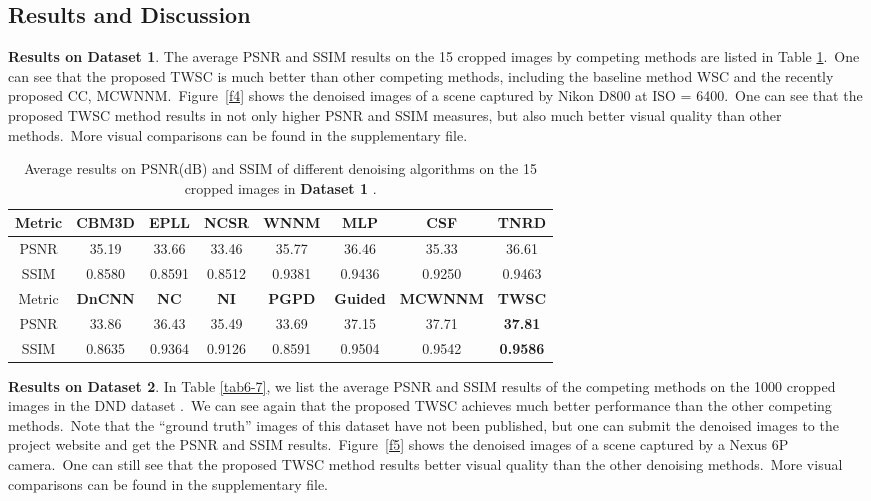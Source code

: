 \subsection{Results and Discussion}

\textbf{Results on Dataset 1}. The average PSNR and SSIM results on the 15 cropped images by competing methods are listed in Table \ref{tab6-6}.\ One can see that the proposed TWSC is much better than other competing methods, including the baseline method WSC and the recently proposed CC, MCWNNM.\ Figure\ \ref{f4} shows the denoised images of a scene captured by Nikon D800 at ISO = 6400.\ One can see that the proposed TWSC method results in not only higher PSNR and SSIM measures, but also much better visual quality than other methods.\ More visual comparisons can be found in the supplementary file.

\begin{table}[hbp]
\caption{Average results on PSNR(dB) and SSIM of different denoising algorithms on the 15 cropped images in \textbf{Dataset 1} \cite{crosschannel2016}.}
\scriptsize
\label{tab6-6}
\begin{center}
\renewcommand\arraystretch{1.2}
\begin{tabular*}{1\textwidth}{@{\extracolsep{\fill}}cccccccc}
\hline
Metric
&
\textbf{CBM3D}
&
\textbf{EPLL}
&
\textbf{NCSR}
&
\textbf{WNNM}
&
\textbf{MLP}
&
\textbf{CSF}
&
\textbf{TNRD}
\\
\hline
PSNR & 35.19  & 33.66 & 33.46 &  35.77 &  36.46 & 35.33 & 36.61  
\\
\hline
SSIM & 0.8580 & 0.8591  & 0.8512 & 0.9381 &  0.9436  & 0.9250 & 0.9463 
\\
\hline
Metric
&
\textbf{DnCNN}
&
\textbf{NC}
&
\textbf{NI}
&
\textbf{PGPD}
&
\textbf{Guided}
&
\textbf{MCWNNM}
&
\textbf{TWSC}
\\
\hline
PSNR &  33.86  & 36.43  & 35.49  & 33.69  &  37.15 &  37.71 &  \textbf{37.81}
\\
\hline
SSIM & 0.8635  &  0.9364 & 0.9126  & 0.8591  & 0.9504 &  0.9542 & \textbf{0.9586}
\\
\hline
\end{tabular*}
\end{center}
\end{table}

\textbf{Results on Dataset 2}. In Table \ref{tab6-7}, we list the average PSNR and SSIM results of the competing methods on the 1000 cropped images in the DND dataset \cite{dnd2017}.\ We can see again that the proposed TWSC achieves much better performance than the other competing methods.\ Note that the ``ground truth'' images of this dataset have not been published, but one can submit the denoised images to the project website and get the PSNR and SSIM results.\ Figure\ \ref{f5} shows the denoised images of a scene captured by a Nexus 6P camera.\ One can still see that the proposed TWSC method results better visual quality than the other denoising methods.\ More visual comparisons can be found in the supplementary file.

